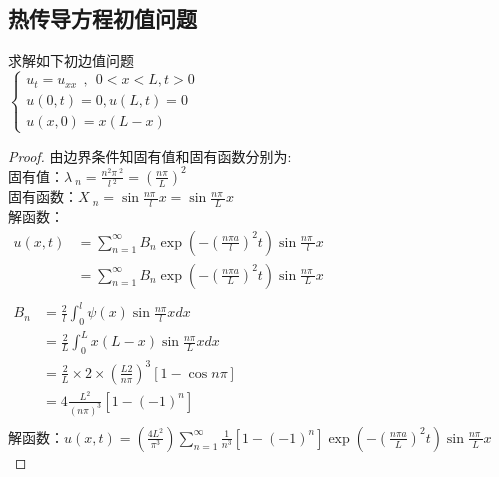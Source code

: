 \subsection{热传导方程初值问题}
\begin{example} %
	求解如下初边值问题\\
	$\displaystyle  \begin{cases}
		u_{t} =u_{xx} ~~,~~ 0<x<L, t>0\\
		u(0,t) =0, u(L,t)=0 \\
		u(x,0) =x(L-x)
	\end{cases}$ \\	
	\begin{proof} 
	由边界条件知固有值和固有函数分别为:\\
	固有值：$\displaystyle  \lambda~_n=\frac{n^2\pi~^2}{l~^2 }= (\frac{n\pi }{L}) ^2$ \\ 
	固有函数：$\displaystyle  X~_n=\sin \frac{n\pi~}{l} x=\sin \frac{n\pi~}{L} x $\\
	解函数：\\ 
		$\displaystyle \begin{array}{llll}
			u(x,t)&=\sum_{n=1}^{\infty } B_n  \exp(-(\frac{n\pi a}{l})^2 t) \sin \frac{n\pi~}{l} x\\
			        &= \sum_{n=1}^{\infty } B_n  \exp(-(\frac{n\pi a}{L})^2 t) \sin \frac{n\pi~}{L} x \\
		\end{array}$ \\ 
	
		$\displaystyle \begin{array}{lllllllll}
		B_n&= \frac{2}{l}\int_{0 }^{l}  \psi (x) \sin \frac{ n\pi }{l} x dx  \\
		       &= \frac{2}{L}\int_{0 }^{L}  x(L-x) \sin \frac{ n\pi }{L} x dx  \\
		       &=\frac{2}{L} \times2\times (\frac{L2}{n\pi})^3  [1-\cos n \pi ]  \\
		       &= 4 \frac{L^2}{(n\pi)^3}[1-(-1)^n ]  \\
		\end{array}$ \\ 
		解函数：$\displaystyle  u(x,t) =  (\frac{4L^2}{\pi ^3}) \sum_{n=1}^{\infty} \frac{1}{n^3} [1-(-1)^n ]  \exp(-(\frac{n\pi a}{L})^2 t) \sin \frac{n\pi~}{L} x  $\\
	\end{proof}
\end{example}

